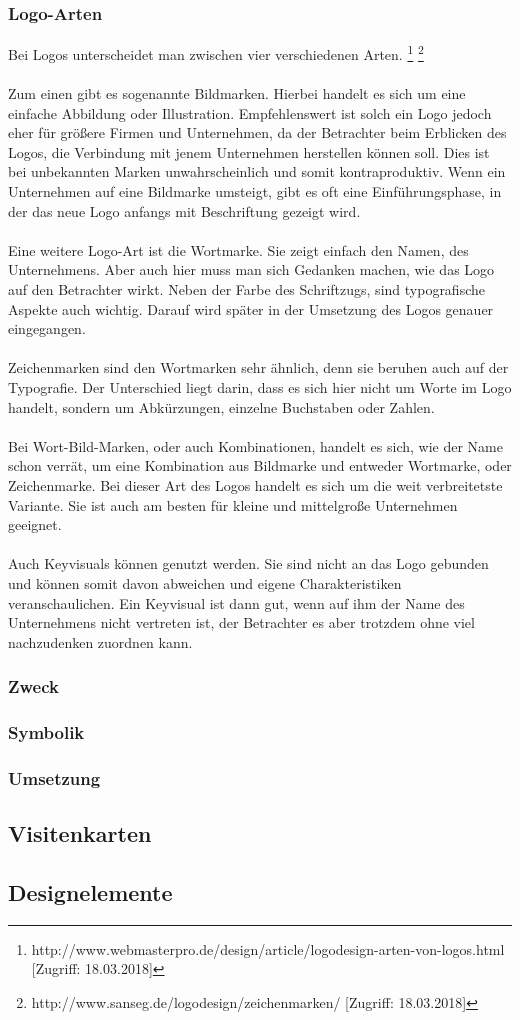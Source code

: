 \subsubsection{Logo-Arten}
Bei Logos unterscheidet man zwischen vier verschiedenen Arten. \footnote{\label{foot:3} http://www.webmasterpro.de/design/article/logodesign-arten-von-logos.html [Zugriff: 18.03.2018]} \footnote{\label{foot:4} http://www.sanseg.de/logodesign/zeichenmarken/ [Zugriff: 18.03.2018]}
\\
\\
Zum einen gibt es sogenannte Bildmarken. Hierbei handelt es sich um eine einfache Abbildung oder Illustration. Empfehlenswert ist solch ein Logo jedoch eher für größere Firmen und Unternehmen, da der Betrachter beim Erblicken des Logos, die Verbindung mit jenem Unternehmen herstellen können soll. Dies ist bei unbekannten Marken unwahrscheinlich und somit kontraproduktiv. Wenn ein Unternehmen auf eine Bildmarke umsteigt, gibt es oft eine Einführungsphase, in der das neue Logo anfangs mit Beschriftung gezeigt wird.
\\
\\
Eine weitere Logo-Art ist die Wortmarke. Sie zeigt einfach den Namen, des Unternehmens. Aber auch hier muss man sich Gedanken machen, wie das Logo auf den Betrachter wirkt. Neben der Farbe des Schriftzugs, sind typografische Aspekte auch wichtig. Darauf wird später in der Umsetzung des Logos genauer eingegangen.
\\
\\
Zeichenmarken sind den Wortmarken sehr ähnlich, denn sie beruhen auch auf der Typografie. Der Unterschied liegt darin, dass es sich hier nicht um Worte im Logo handelt, sondern um Abkürzungen, einzelne Buchstaben oder Zahlen.
\\
\\
Bei Wort-Bild-Marken, oder auch Kombinationen, handelt es sich, wie der Name schon verrät, um eine Kombination aus Bildmarke und entweder Wortmarke, oder Zeichenmarke. Bei dieser Art des Logos handelt es sich um die weit verbreitetste Variante. Sie ist auch am besten für kleine und mittelgroße Unternehmen geeignet.
\\
\\
Auch Keyvisuals können genutzt werden. Sie sind nicht an das Logo gebunden und können somit davon abweichen und eigene Charakteristiken veranschaulichen. Ein Keyvisual ist dann gut, wenn auf ihm der Name des Unternehmens nicht vertreten ist, der Betrachter es aber trotzdem ohne viel nachzudenken zuordnen kann.

\subsubsection{Zweck}
\subsubsection{Symbolik}
\subsubsection{Umsetzung}
\subsection{Visitenkarten}
\subsection{Designelemente}